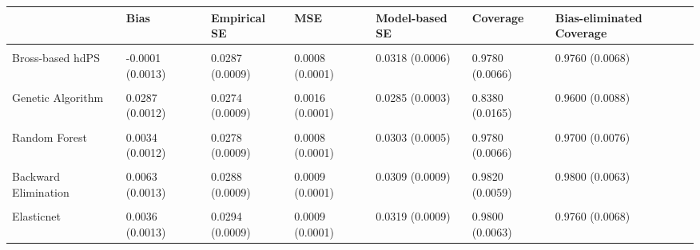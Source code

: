\begin{table}[!h]
\centering
\begin{tabular}{l|l|l|l|l|l|l}
\hline
  & Bias & Empirical SE & MSE & Model-based SE & Coverage & Bias-eliminated Coverage\\
\hline
\cellcolor{gray!10}{Kitchen sink} & \cellcolor{gray!10}{0.0002 (0.0014)} & \cellcolor{gray!10}{0.0305 (0.0010)} & \cellcolor{gray!10}{0.0009 (0.0001)} & \cellcolor{gray!10}{0.0333 (0.0007)} & \cellcolor{gray!10}{0.9720 (0.0074)} & \cellcolor{gray!10}{0.9720 (0.0074)}\\
\hline
Bross-based hdPS & -0.0001 (0.0013) & 0.0287 (0.0009) & 0.0008 (0.0001) & 0.0318 (0.0006) & 0.9780 (0.0066) & 0.9760 (0.0068)\\
\hline
\cellcolor{gray!10}{Hybrid hdPS} & \cellcolor{gray!10}{0.0016 (0.0012)} & \cellcolor{gray!10}{0.0278 (0.0009)} & \cellcolor{gray!10}{0.0008 (0.0001)} & \cellcolor{gray!10}{0.0306 (0.0007)} & \cellcolor{gray!10}{0.9820 (0.0059)} & \cellcolor{gray!10}{0.9800 (0.0063)}\\
\hline
Genetic Algorithm & 0.0287 (0.0012) & 0.0274 (0.0009) & 0.0016 (0.0001) & 0.0285 (0.0003) & 0.8380 (0.0165) & 0.9600 (0.0088)\\
\hline
\cellcolor{gray!10}{XGBoost} & \cellcolor{gray!10}{0.0074 (0.0010)} & \cellcolor{gray!10}{0.0229 (0.0007)} & \cellcolor{gray!10}{0.0006 (0.0000)} & \cellcolor{gray!10}{0.0268 (0.0002)} & \cellcolor{gray!10}{0.9740 (0.0071)} & \cellcolor{gray!10}{0.9760 (0.0068)}\\
\hline
Random Forest & 0.0034 (0.0012) & 0.0278 (0.0009) & 0.0008 (0.0001) & 0.0303 (0.0005) & 0.9780 (0.0066) & 0.9700 (0.0076)\\
\hline
\cellcolor{gray!10}{Forward Selection} & \cellcolor{gray!10}{0.0059 (0.0012)} & \cellcolor{gray!10}{0.0271 (0.0009)} & \cellcolor{gray!10}{0.0008 (0.0001)} & \cellcolor{gray!10}{0.0304 (0.0008)} & \cellcolor{gray!10}{0.9800 (0.0063)} & \cellcolor{gray!10}{0.9760 (0.0068)}\\
\hline
Backward Elimination & 0.0063 (0.0013) & 0.0288 (0.0009) & 0.0009 (0.0001) & 0.0309 (0.0009) & 0.9820 (0.0059) & 0.9800 (0.0063)\\
\hline
\cellcolor{gray!10}{LASSO} & \cellcolor{gray!10}{0.0043 (0.0013)} & \cellcolor{gray!10}{0.0299 (0.0009)} & \cellcolor{gray!10}{0.0009 (0.0001)} & \cellcolor{gray!10}{0.0319 (0.0010)} & \cellcolor{gray!10}{0.9820 (0.0059)} & \cellcolor{gray!10}{0.9780 (0.0066)}\\
\hline
Elasticnet & 0.0036 (0.0013) & 0.0294 (0.0009) & 0.0009 (0.0001) & 0.0319 (0.0009) & 0.9800 (0.0063) & 0.9760 (0.0068)\\
\hline
\end{tabular}
\end{table}
